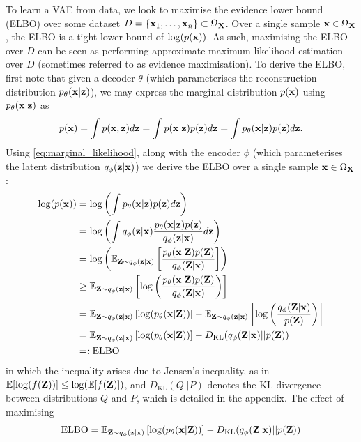 \documentclass[11pt]{article}
\begin{document}
To learn a VAE from data, we look to maximise the evidence lower bound (ELBO) over some dataset $D=\{\mathbf{x}_1,\dots,\mathbf{x}_n\}\subset\Omega_{\mathbf{X}}$. Over a single sample $\mathbf{x}\in\Omega_{\mathbf{X}}$, the ELBO is a tight lower bound of $\log(p(\mathbf{x}))$. As such, maximising the ELBO over $D$ can be seen as performing approximate maximum-likelihood estimation over $D$ (sometimes referred to as evidence maximisation). To derive the ELBO, first note that given a decoder $\theta$ (which parameterises the reconstruction distribution $p_{\theta}(\mathbf{x}|\mathbf{z})$), we may express the marginal distribution $p(\mathbf{x})$ using $p_{\theta}(\mathbf{x}|\mathbf{z})$ as
\begin{equation}
\label{eq:marginal_likelihood}
p(\mathbf{x})
=
\int p(\mathbf{x},\mathbf{z})d\mathbf{z}
=
\int p(\mathbf{x}|\mathbf{z})p(\mathbf{z})d\mathbf{z}
=
\int p_{\theta}(\mathbf{x}|\mathbf{z})p(\mathbf{z})d\mathbf{z}.
\end{equation}
Using \autoref{eq:marginal_likelihood}, along with the encoder $\phi$ (which parameterises the latent distribution $q_{\phi}(\mathbf{z}|\mathbf{x})$) we derive the ELBO over a single sample $\mathbf{x}\in\Omega_{\mathbf{X}}$:
\begin{align*}
    \log(p(\mathbf{x}))
    &=
    \log\left(\int p_{\theta}(\mathbf{x}|\mathbf{z})p(\mathbf{z})d\mathbf{z}\right)\\
    &=
    \log\left(\int q_{\phi}(\mathbf{z}|\mathbf{x})\frac{p_{\theta}(\mathbf{x}|\mathbf{z})p(\mathbf{z})}{q_{\phi}(\mathbf{z}|\mathbf{x})}d\mathbf{z}\right)\\
    &=
    \log\left(\mathbb{E}_{\mathbf{Z}\sim q_{\phi}(\mathbf{z}|\mathbf{x})}\left[\frac{p_{\theta}(\mathbf{x}|\mathbf{Z})p(\mathbf{Z})}{q_{\phi}(\mathbf{Z}|\mathbf{x})}\right]\right)\\
    &\geq
    \mathbb{E}_{\mathbf{Z}\sim q_{\phi}(\mathbf{z}|\mathbf{x})}\left[\log\left(\frac{p_{\theta}(\mathbf{x}|\mathbf{Z})p(\mathbf{Z})}{q_{\phi}(\mathbf{Z}|\mathbf{x})}\right)\right]\\
    &=
    \mathbb{E}_{\mathbf{Z}\sim q_{\phi}(\mathbf{z}|\mathbf{x})}\left[\log(p_{\theta}(\mathbf{x}|\mathbf{Z}))\right]-\mathbb{E}_{\mathbf{Z}\sim q_{\phi}(\mathbf{z}|\mathbf{x})}\left[\log\left(\frac{q_{\phi}(\mathbf{Z}|\mathbf{x})}{p(\mathbf{Z})}\right)\right]\\
    &=
    \mathbb{E}_{\mathbf{Z}\sim q_{\phi}(\mathbf{z}|\mathbf{x})}\left[\log(p_{\theta}(\mathbf{x}|\mathbf{Z}))\right]-D_{\text{KL}}(q_{\phi}(\mathbf{Z}|\mathbf{x})||p(\mathbf{Z}))\\
    &=:
    \text{ELBO}
\end{align*}
in which the inequality arises due to Jensen's inequality, as in $\mathbb{E}[\log(f(\mathbf{Z}))]\leq\log(\mathbb{E}[f(\mathbf{Z})])$, and $D_\text{KL}(Q||P)$ denotes the KL-divergence between distributions $Q$ and $P$, which is detailed in the appendix. The effect of maximising
$$
\text{ELBO}
=
\mathbb{E}_{\mathbf{Z}\sim q_{\phi}(\mathbf{z}|\mathbf{x})}\left[\log(p_{\theta}(\mathbf{x}|\mathbf{Z}))\right]-D_{\text{KL}}(q_{\phi}(\mathbf{Z}|\mathbf{x})||p(\mathbf{Z}))
$$
\end{document}
